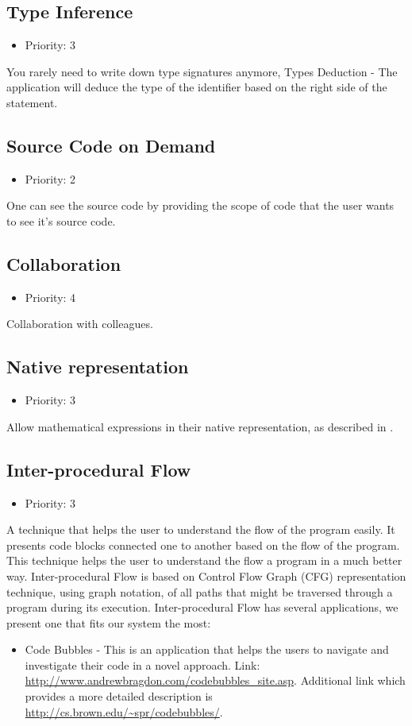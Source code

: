 \subsection{Type Inference}
\begin{itemize}
	\item Priority: 3
\end{itemize}
You rarely need to write down type signatures anymore, Types Deduction - The application will deduce the type of the identifier based on the right side of the statement.
\subsection{Source Code on Demand}
\begin{itemize}
	\item Priority: 2
\end{itemize}
One can see the source code by providing the scope of code that the user wants to see it's source code.
\subsection{Collaboration}
\begin{itemize}
	\item Priority: 4
\end{itemize}
Collaboration with colleagues.
\subsection{Native representation}
\begin{itemize}
	\item Priority: 3
\end{itemize}
Allow mathematical expressions in their native representation, as described in \citet{andrew08}.
\subsection{Inter-procedural Flow}
\begin{itemize}
	\item Priority: 3
\end{itemize}
A technique that helps the user to understand the flow of the program easily.  It presents code blocks connected one to another based on the flow of the program. This technique helps the user to understand the flow a program in a much better way. Inter-procedural Flow is based on Control Flow Graph (CFG) representation technique, using graph notation, of all paths that might be traversed through a program during its execution. Inter-procedural Flow has several applications, we present one that fits our system the most:
\begin{itemize}
	\item Code Bubbles - This is an application that helps the users to navigate and investigate their code in a novel approach. Link: \url{http://www.andrewbragdon.com/codebubbles\_site.asp}. Additional link which provides a more detailed description is \url{http://cs.brown.edu/~spr/codebubbles/}.
\end{itemize}
